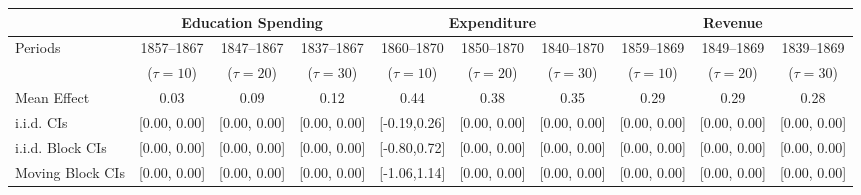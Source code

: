 \begin{tabular}{@{}lccccccccc@{}}
		\toprule
		 & \multicolumn{3}{c}{Education Spending}        & \multicolumn{3}{c}{Expenditure}            & \multicolumn{3}{c}{Revenue}                \\ \midrule
Periods		 & 1857--1867     & 1847--1867      & 1837--1867      & 1860--1870     & 1850--1870     & 1840--1870  	  & 1859--1869      & 1849--1869   	  & 1839--1869   \\
	 	 & ($\tau = 10$)  & ($\tau = 20$)   & ($\tau = 30$)   & ($\tau = 10$)  & ($\tau = 20$)  & ($\tau = 30$)   &  ($\tau = 10$)  &  ($\tau = 20$)  &  ($\tau = 30$)  \\
		\hline
		Mean Effect                       	   &   0.03        & 	0.09       & 	0.12       &       0.44   &   0.38	     & 	0.35	    & 	0.29       &   0.29       & 	0.28\\
		i.i.d. CIs                     		   & [0.00, 0.00]  & [0.00, 0.00]  & [0.00, 0.00]  & [-0.19,0.26] & [0.00, 0.00] & [0.00, 0.00] & [0.00, 0.00] & [0.00, 0.00] & [0.00, 0.00] \\
		i.i.d. Block CIs                       & [0.00, 0.00]  & [0.00, 0.00]  & [0.00, 0.00]  & [-0.80,0.72] & [0.00, 0.00] & [0.00, 0.00] & [0.00, 0.00] & [0.00, 0.00] & [0.00, 0.00] \\
		Moving Block CIs                       & [0.00, 0.00]  & [0.00, 0.00]  & [0.00, 0.00]  & [-1.06,1.14] & [0.00, 0.00] & [0.00, 0.00] & [0.00, 0.00] & [0.00, 0.00] & [0.00, 0.00] \\ \bottomrule
\end{tabular}
